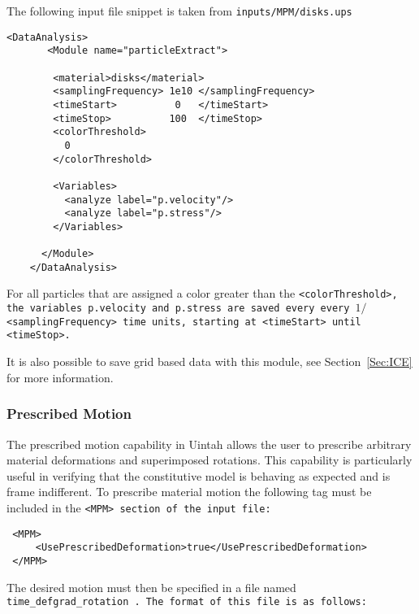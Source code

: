 The following input file snippet is taken from
\tt inputs/MPM/disks.ups \normalfont  
\begin{Verbatim}[fontsize=\footnotesize]
    <DataAnalysis>
       <Module name="particleExtract">

        <material>disks</material>
        <samplingFrequency> 1e10 </samplingFrequency>
        <timeStart>          0   </timeStart>
        <timeStop>          100  </timeStop>
        <colorThreshold>
          0
        </colorThreshold>

        <Variables>
          <analyze label="p.velocity"/>
          <analyze label="p.stress"/>
        </Variables>

      </Module>
    </DataAnalysis>
\end{Verbatim}

For all particles that are assigned a color greater than the
\tt <colorThreshold>, \normalfont the variables
\tt p.velocity \normalfont and
\tt p.stress \normalfont are saved every every
$1/$\tt <samplingFrequency> \normalfont time units, starting at
\tt <timeStart> \normalfont until
\tt <timeStop>. \normalfont

It is also possible to save grid based data with this module,
see Section~\ref{Sec:ICE} for more information.

\subsubsection{Prescribed Motion} \label{Sec:PrescribedMotion} The prescribed motion
capability in Uintah allows the user to prescribe arbitrary material
deformations and superimposed rotations.  This capability is particularly
useful in verifying that the constitutive model is behaving as expected and is
frame indifferent.  To prescribe material motion the following tag must be
included in the \tt <MPM> \normalfont section of the input file:

\begin{Verbatim}
 <MPM>
     <UsePrescribedDeformation>true</UsePrescribedDeformation>
 </MPM>
\end{Verbatim}

The desired motion must then be specified in a file named \tt time\_defgrad\_rotation \normalfont.  The format of this file is as follows:

